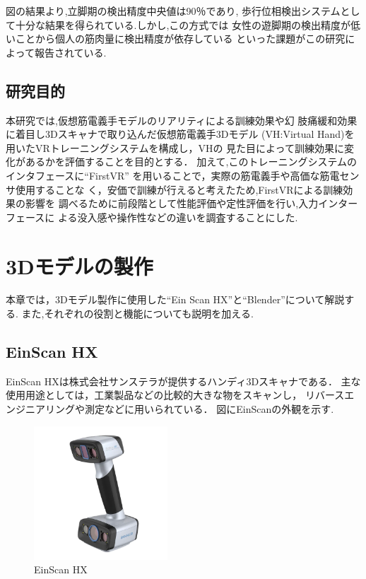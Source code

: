 \documentclass{ltjsreport}
\begin{document}
		図の結果より,立脚期の検出精度中央値は90％であり,
		歩行位相検出システムとして十分な結果を得られている.しかし,この方式では
		女性の遊脚期の検出精度が低いことから個人の筋肉量に検出精度が依存している
		といった課題がこの研究によって報告されている.

		\section{研究目的}
		本研究では,仮想筋電義手モデルのリアリティによる訓練効果や幻
		肢痛緩和効果に着目し3Dスキャナで取り込んだ仮想筋電義手3Dモデル
		(VH:Virtual Hand)を用いたVRトレーニングシステムを構成し，VHの
		見た目によって訓練効果に変化があるかを評価することを目的とする．
		加えて,このトレーニングシステムのインタフェースに``FirstVR''\cite{ref:5}
		を用いることで，実際の筋電義手や高価な筋電センサ使用することな
		く，安価で訓練が行えると考えたため,FirstVRによる訓練効果の影響を
		調べるために前段階として性能評価や定性評価を行い,入力インターフェースに
		よる没入感や操作性などの違いを調査することにした.


\chapter{3Dモデルの製作}
	本章では，3Dモデル製作に使用した``Ein Scan HX''と``Blender''について解説する.
	また,それぞれの役割と機能についても説明を加える.

	\section{EinScan HX}
		EinScan HXは株式会社サンステラが提供するハンディ3Dスキャナである．
		主な使用用途としては，工業製品などの比較的大きな物をスキャンし，
		リバースエンジニアリングや測定などに用いられている．
		図にEinScanの外観を示す.

		\begin{figure}[H]
		\centering
		\includegraphics[width = 5cm]{../figs/EinScan.png}
		\caption{EinScan HX}
		\label{fig:EinScan}
		\end{figure}
\end{document}
